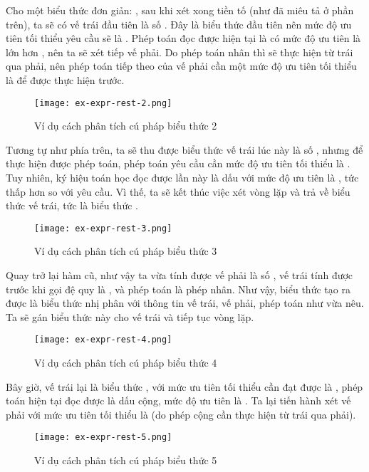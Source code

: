 Cho một biểu thức đơn giản: , sau khi xét xong tiền tố (như đã miêu tả ở phần trên), ta sẽ có vế trái đầu tiên là số . Đây là biểu thức đầu tiên nên mức độ ưu tiên tối thiểu yêu cầu sẽ là . Phép toán đọc được hiện tại là \kw{*} có mức độ ưu tiên là  lớn hơn , nên ta sẽ xét tiếp vế phải. Do phép toán nhân thì sẽ thực hiện từ trái qua phải, nên phép toán tiếp theo của vế phải cần một mức độ ưu tiên tối thiểu là  để được thực hiện trước.

\begin{figure}[H]
    \centering
    \texttt{[image: ex-expr-rest-2.png]}
    \caption{Ví dụ cách phân tích cú pháp biểu thức 2}
\end{figure}

    Tương tự như phía trên, ta sẽ thu được biểu thức vế trái lúc này là số , nhưng để thực hiện được phép toán, phép toán yêu cầu cần mức độ ưu tiên tối thiểu là . Tuy nhiên, ký hiệu toán học đọc được lần này là dấu \kw{+} với mức độ ưu tiên là , tức thấp hơn so với yêu cầu. Vì thế, ta sẽ kết thúc việc xét vòng lặp và trả về biểu thức vế trái, tức là biểu thức .

\begin{figure}[H]
    \centering
    \texttt{[image: ex-expr-rest-3.png]}
    \caption{Ví dụ cách phân tích cú pháp biểu thức 3}
\end{figure}

    Quay trở lại hàm cũ, như vậy ta vừa tính được vế phải là số , vế trái tính được trước khi gọi đệ quy là , và phép toán là phép nhân. Như vậy, biểu thức tạo ra được là biểu thức nhị phân với thông tin vế trái, vế phải, phép toán như vừa nêu. Ta sẽ gán biểu thức này cho vế trái và tiếp tục vòng lặp.

\begin{figure}[H]
    \centering
    \texttt{[image: ex-expr-rest-4.png]}
    \caption{Ví dụ cách phân tích cú pháp biểu thức 4}
\end{figure}

    Bây giờ, vế trái lại là biểu thức , với mức ưu tiên tối thiểu cần đạt được là , phép toán hiện tại đọc được là dấu cộng, mức độ ưu tiên là . Ta lại tiến hành xét vế phải với mức ưu tiên tối thiểu là  (do phép cộng cần thực hiện từ trái qua phải). 

\begin{figure}[H]
    \centering
    \texttt{[image: ex-expr-rest-5.png]}
    \caption{Ví dụ cách phân tích cú pháp biểu thức 5}
\end{figure}

